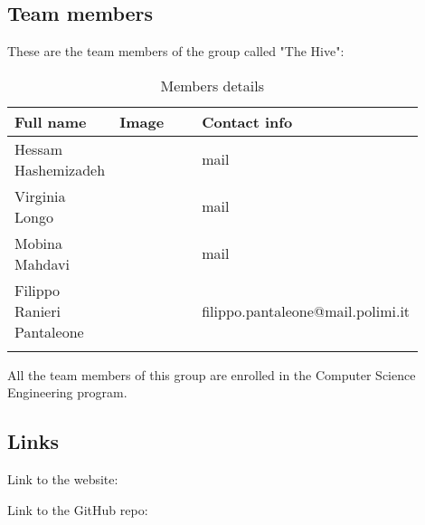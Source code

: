 \subsection{Team members}
These are the team members of the group called "The Hive":
\begin{longtable}
    {|m{0.2\linewidth}|m{0.2\linewidth}|m{0.5\linewidth}|}
            \hline
            \textbf{Full name} & \textbf{Image} & \textbf{Contact info}\\
            \hline
            \endhead
                Hessam Hashemizadeh &
                \centering
                & mail \\
            \hline
                Virginia Longo  &
                \centering
                & mail \\
            \hline
                Mobina Mahdavi &
                \centering
                & mail \\
            \hline
                Filippo Ranieri Pantaleone &
                \centering
                & filippo.pantaleone@mail.polimi.it \\
            \hline
            \caption{Members details}
            \label{table:mem_details}
\end{longtable}

All the team members of this group are enrolled in the Computer Science Engineering program.

\subsection{Links}
Link to the website:

Link to the GitHub repo:

\newpage

